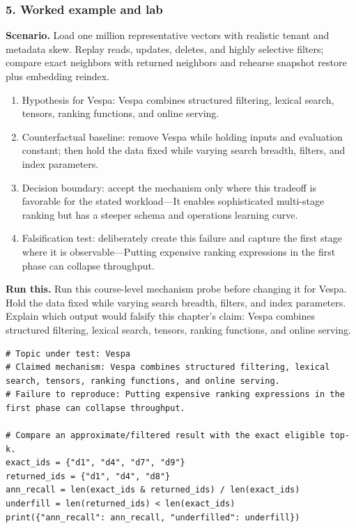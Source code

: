 \subsubsection*{5. Worked example and lab}
\textbf{Scenario.} Load one million representative vectors with realistic tenant and metadata skew. Replay reads, updates, deletes, and highly selective filters; compare exact neighbors with returned neighbors and rehearse snapshot restore plus embedding reindex.
\begin{enumerate}
\item Hypothesis for Vespa: Vespa combines structured filtering, lexical search, tensors, ranking functions, and online serving.
\item Counterfactual baseline: remove Vespa while holding inputs and evaluation constant; then hold the data fixed while varying search breadth, filters, and index parameters.
\item Decision boundary: accept the mechanism only where this tradeoff is favorable for the stated workload—It enables sophisticated multi-stage ranking but has a steeper schema and operations learning curve.
\item Falsification test: deliberately create this failure and capture the first stage where it is observable—Putting expensive ranking expressions in the first phase can collapse throughput.
\end{enumerate}
\textbf{Run this.} Run this course-level mechanism probe before changing it for Vespa. Hold the data fixed while varying search breadth, filters, and index parameters. Explain which output would falsify this chapter's claim: Vespa combines structured filtering, lexical search, tensors, ranking functions, and online serving.
\begin{Verbatim}[fontsize=\scriptsize]
# Topic under test: Vespa
# Claimed mechanism: Vespa combines structured filtering, lexical search, tensors, ranking functions, and online serving.
# Failure to reproduce: Putting expensive ranking expressions in the first phase can collapse throughput.

# Compare an approximate/filtered result with the exact eligible top-k.
exact_ids = {"d1", "d4", "d7", "d9"}
returned_ids = {"d1", "d4", "d8"}
ann_recall = len(exact_ids & returned_ids) / len(exact_ids)
underfill = len(returned_ids) < len(exact_ids)
print({"ann_recall": ann_recall, "underfilled": underfill})
\end{Verbatim}
